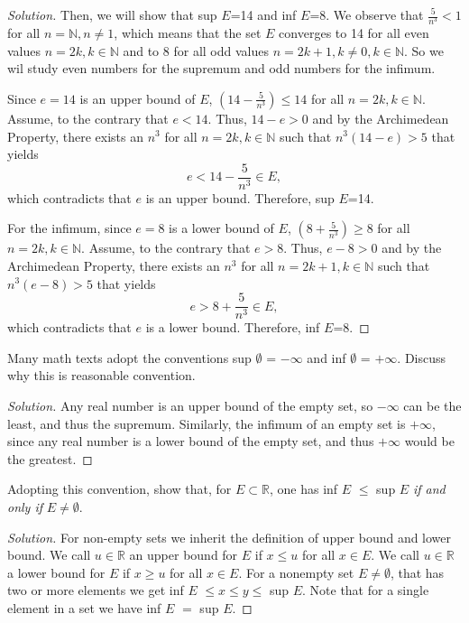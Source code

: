\documentclass[12pt]{article}
\newenvironment{exercise}[2][Exercise]{\begin{trivlist}
\item[\hskip \labelsep {\bfseries #1}\hskip \labelsep {\bfseries #2.}]}{\end{trivlist}}
\newenvironment{solution}{\begin{proof}[Solution]}{\end{proof}}
\begin{document}
\begin{solution}
Then, we will show that sup $E$=14 and inf $E$=8. We observe that $\frac{5}{n^3}<1$ for all $n= \mathbb{N}, n\neq 1$, which means that the set $E$ converges to 14 for all even values $n=2k, k \in \mathbb{N}$ and to 8 for all odd values $n=2k+1, k\neq 0, k \in \mathbb{N}$. So we wil study even numbers for the supremum and odd numbers for the infimum.

Since $e=14$ is an upper bound of $E$, $(14-\frac{5}{n^3}) \leq 14$ for all $n=2k, k \in \mathbb{N}$. Assume, to the contrary that $e<14$. Thus, $14-e>0$ and by the Archimedean Property, there exists an $n^3$ for all $n=2k, k \in \mathbb{N}$ such that $n^3(14-e)>5$ that yields
\begin{equation}
e<14-\frac{5}{n^3} \in E, 
\end{equation}
which contradicts that $e$ is an upper bound. Therefore, sup $E$=14. 

For the infimum, since $e=8$ is a lower bound of $E$, $(8+\frac{5}{n^3}) \geq 8$ for all $n=2k, k \in \mathbb{N}$. Assume, to the contrary that $e>8$. Thus, $e-8>0$ and by the Archimedean Property, there exists an $n^3$ for all $n=2k+1, k \in \mathbb{N}$ such that $n^3(e-8)>5$ that yields
\begin{equation}
e>8+\frac{5}{n^3} \in E, 
\end{equation} 
which contradicts that $e$ is a lower bound. Therefore, inf $E$=8.
 
\end{solution}

\begin{exercise}{6 (a)} %
Many math texts adopt the conventions sup $\emptyset$ = $- \infty$ and inf $\emptyset$ = $+ \infty$. Discuss why this is reasonable convention.
\end{exercise}
\begin{solution}
Any real number is an upper bound of the empty set, so $- \infty$ can be the least, and thus the supremum. Similarly, the infimum of an empty set is $+ \infty$, since any real number is a lower bound of the empty set, and thus $+ \infty$ would be the greatest.
\end{solution}

\begin{exercise}{6 (b)} %
Adopting this convention, show that, for $E \subset \mathbb{R}$, one has inf $E$ $\leq$ sup $E$ \textit{if and only if} $E \neq \emptyset$.
\end{exercise}
\begin{solution}
For non-empty sets we inherit the definition of upper bound and lower bound. We call $u \in \mathbb{R}$ an upper bound for $E$ if $x\leq u$ for all $x\in E$. We call $u \in \mathbb{R}$ a lower bound for $E$ if $x\geq u$ for all $x\in E$. For a nonempty set $E\neq \emptyset$, that has two or more elements we get inf $E$ $\leq x \leq y \leq $ sup $E$. Note that for a single element in a set we have inf $E$ $=$ sup $E$. 
\end{solution}
\end{document}

